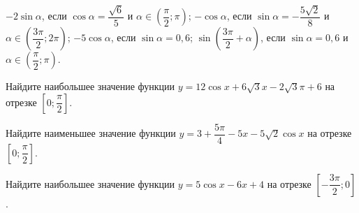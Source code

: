 \begin{class}[number=4]
\begin{listofex}
\begin{tasks}
			\task \( -2\sin\alpha \), если \( \cos\alpha=\dfrac{\sqrt{6}}{5} \) и \( \alpha\in\left( \dfrac{\pi}{2}; \pi \right) \);
			\task \( -\cos\alpha \), если \( \sin\alpha=-\dfrac{5\sqrt{2}}{8} \) и \( \alpha\in\left( \dfrac{3\pi}{2}; 2\pi \right) \);
			\task \( -5\cos\alpha \), если \( \sin\alpha=0,6 \);
			\task \( \sin\left( \dfrac{3\pi}{2}+\alpha \right) \), если \( \sin\alpha=0,6 \) и \( \alpha\in\left( \dfrac{\pi}{2}; \pi \right) \).
		\end{tasks}
		
		\item Найдите наибольшее значение функции \( y=12 \cos x + 6 \sqrt{3} x -2 \sqrt{3} \pi + 6 \) на отрезке \(\left[ 0;\dfrac{ \pi }{ 2 } \right] \).
		\item Найдите наименьшее значение функции \( y=3+\dfrac{5\pi  }{4  }-5x-5\sqrt{2} \cos x \) на отрезке \(\left[ 0; \dfrac{ \pi }{ 2 } \right] \).
		\item Найдите наибольшее значение функции \( y=5 \cos x -6x+4 \) на отрезке \(\left[ -\dfrac{3\pi  }{ 2 };0 \right] \).
		
	\end{listofex}
\end{class}

